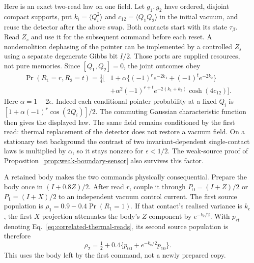 Here is an exact two-read law on one field. Let $g_1,g_2$ have ordered,
disjoint compact supports, put $k_i=\langle Q_i^2\rangle$ and
$c_{12}=\langle Q_1Q_2\rangle$ in the initial vacuum, and reuse the detector
after the above swap. Both contacts start with its state $\tau_\beta$.
Read $Z_s$ and use it for the subsequent command before each reset.
A nondemolition dephasing of the pointer can be implemented by a controlled
$Z_s$ using a separate degenerate Gibbs bit $I/2$. Those ports are supplied
resources, not pure memories. Since $[Q_1,Q_2]=0$, the joint outcomes obey
\begin{equation}\label{eq:correlated-thermal-reads}
\begin{split}
 \Pr(R_1=r,R_2=t)=\frac14\bigl[&
 1+\alpha\{(-1)^re^{-2k_1}+(-1)^te^{-2k_2}\}\\
 &+\alpha^2(-1)^{r+t}e^{-2(k_1+k_2)}\cosh(4c_{12})\bigr].
\end{split}
\end{equation}
Here $\alpha=1-2\epsilon$.
Indeed each conditional pointer probability at a fixed $Q_i$ is
$[1+\alpha(-1)^r\cos(2Q_i)]/2$.
The commuting Gaussian characteristic function then gives the displayed law.
The same field remains conditioned by the first read: thermal replacement of
the detector does not restore a vacuum field. On a stationary test background
the contrast of two invariant-dependent single-contact laws is multiplied
by $\alpha$, so it stays nonzero for $\epsilon<1/2$.
The weak-source proof of Proposition~\ref{prop:weak-boundary-sensor}
also survives this factor.

A retained body makes the two commands physically consequential.
Prepare the body once in $(I+0.8Z)/2$. After read $r$, couple it through
$P_0=(I+Z)/2$ or $P_1=(I+X)/2$ to an independent vacuum control current.
The first source population is $\rho_1=0.9-0.4\Pr(R_1=1)$.
If that contact's realised variance is $k_c$, the first $X$ projection
attenuates the body's $Z$ component by $e^{-k_c/2}$.
With $p_{rt}$ denoting Eq.~\eqref{eq:correlated-thermal-reads}, its second
source population is therefore
\begin{equation}\label{eq:held-body-second-source}
 \rho_2=\tfrac12+0.4\{p_{00}+e^{-k_c/2}p_{10}\}.
\end{equation}
This uses the body left by the first command, not a newly prepared copy.

